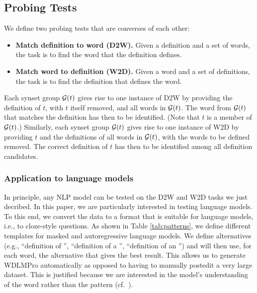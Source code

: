 \documentclass[11pt,a4paper]{article}
\begin{document}
\subsection{Probing Tests}

We define two probing tests that are converses of each other:
\begin{itemize}
  \item \textbf{Match definition to word (D2W).} Given a
    definition and a set of words, the task is to find the
    word that the definition defines.
  \item \textbf{Match word to definition (W2D).} Given a
    word and a set of definitions, the task is to find the
    definition that defines the word.
    \end{itemize}
Each synset group ${\cal G}(t)$ gives rise to one instance
of D2W by providing the definition of $t$, with $t$ itself
removed, and all words in
${\cal G}(t)$. The word from ${\cal G}(t)$ that matches the
definition has then to be identified. (Note that $t$ is a
member of ${\cal G}(t)$.)
Similarly, each synset group ${\cal G}(t)$ gives rise to one instance
of W2D by providing $t$ and the definitions of all words in
${\cal G}(t)$, with the words to be defined removed. The
correct definition  of $t$ has then to be identified among
all definition  candidates.

\subsubsection{Application to language models}
In principle, any NLP model can be tested on the D2W and W2D
tasks we just decribed. In this paper, we are particularly
interested in testing language models. To this end, we 
convert the data to a format that is suitable for language
models, i.e., to cloze-style questions.  As shown in Table
\ref{tab:patterns}, we define different templates for masked
and autoregressive language models. We define alternatives
(e.g., ``definition of \underline{\hspace{3mm}}'', 
``definition of a \underline{\hspace{3mm}}'', 
``definition of an \underline{\hspace{3mm}}'') and will then
use, for each word, the alternative that gives the best
result. This allows us to generate 
WDLMPro automatically as opposed to having to manually
postedit a very large dataset.
This is justified because
we are interested in
the model's understanding of the word rather than the
pattern
(cf.\ 
).
\end{document}

